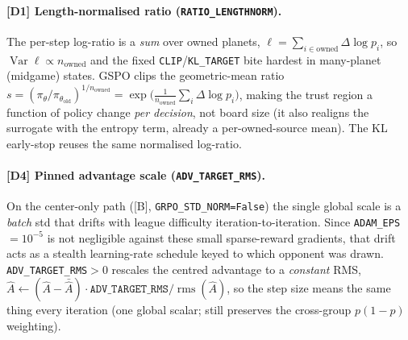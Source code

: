 \documentclass[11pt]{article}
\newcommand{\Var}{\operatorname{Var}}
\newcommand{\Adv}{\widehat{A}}
\newcommand{\pol}{\pi_\theta}
\newcommand{\polold}{\pi_{\theta_{\mathrm{old}}}}
\newcommand{\cd}[1]{\texttt{#1}}
\begin{document}
\paragraph{[D1] Length-normalised ratio (\cd{RATIO\_LENGTHNORM}).} The per-step log-ratio is a \emph{sum}
over owned planets, $\ell=\sum_{i\in\text{owned}}\Delta\log p_i$, so $\Var\ell\propto n_{\text{owned}}$ and
the fixed \cd{CLIP}/\cd{KL\_TARGET} bite hardest in many-planet (midgame) states. GSPO clips the
geometric-mean ratio $s=(\pol/\polold)^{1/n_{\text{owned}}}=\exp\!\big(\tfrac1{n_{\text{owned}}}\sum_i\Delta\log
p_i\big)$, making the trust region a function of policy change \emph{per decision}, not board size (it also
realigns the surrogate with the entropy term, already a per-owned-source mean). The KL early-stop reuses
the same normalised log-ratio.

\paragraph{[D4] Pinned advantage scale (\cd{ADV\_TARGET\_RMS}).} On the center-only path ([B],
\cd{GRPO\_STD\_NORM=False}) the single global scale is a \emph{batch} std that drifts with league
difficulty iteration-to-iteration. Since \cd{ADAM\_EPS}$=10^{-5}$ is not negligible against these small
sparse-reward gradients, that drift acts as a stealth learning-rate schedule keyed to which opponent was
drawn. \cd{ADV\_TARGET\_RMS}$>0$ rescales the centred advantage to a \emph{constant} RMS,
$\Adv\leftarrow(\Adv-\bar\Adv)\cdot\cd{ADV\_TARGET\_RMS}/\operatorname{rms}(\Adv)$, so the step size means
the same thing every iteration (one global scalar; still preserves the cross-group $p(1-p)$ weighting).

\end{document}
